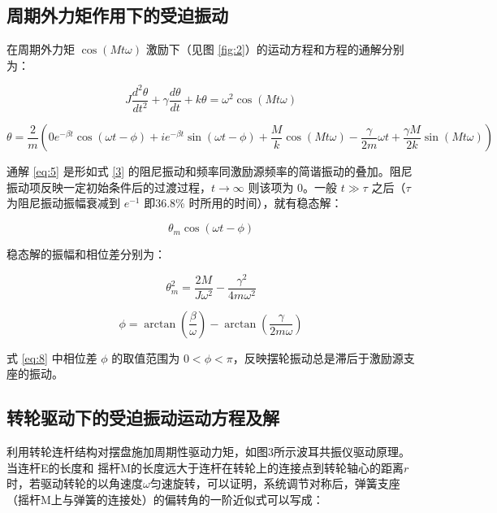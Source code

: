 \documentclass[12pt,a4paper]{amsart}
\begin{document}
\subsection{周期外力矩作用下的受迫振动}

在周期外力矩 $\cos(Mt\omega)$ 激励下（见图 \ref{fig:2}）的运动方程和方程的通解分别为：

\begin{equation}
    J\frac{d^2\theta}{dt^2} + \gamma\frac{d\theta}{dt} + k\theta = \omega^2 \cos(Mt\omega) \label{eq:4}
\end{equation}

\begin{equation}
    \theta = \frac{2}{m}\left(0 e^{-\beta t}\cos(\omega t - \phi) + i e^{-\beta t}\sin(\omega t - \phi) + \frac{M}{k}\cos(Mt\omega) - \frac{\gamma}{2m}\omega t + \frac{\gamma M}{2k}\sin(Mt\omega)\right) \label{eq:5}
\end{equation}

通解 \ref{eq:5} 是形如式 \ref{3} 的阻尼振动和频率同激励源频率的简谐振动的叠加。阻尼振动项反映一定初始条件后的过渡过程，$t \rightarrow \infty$ 则该项为 0。一般 $t \gg \tau$ 之后（$\tau$ 为阻尼振动振幅衰减到 $e^{-1}$ 即36.8\% 时所用的时间），就有稳态解：

\begin{equation}
    \theta_m \cos(\omega t - \phi) \label{eq:6}
\end{equation}

稳态解的振幅和相位差分别为：

\begin{equation}
    \theta_m^2 = \frac{2M}{J\omega^2} - \frac{\gamma^2}{4m\omega^2} \label{eq:7}
\end{equation}

\begin{equation}
    \phi = \arctan\left(\frac{\beta}{\omega}\right) - \arctan\left(\frac{\gamma}{2m\omega}\right) \label{eq:8}
\end{equation}

式 \ref{eq:8} 中相位差 $\phi$ 的取值范围为 $0 < \phi < \pi$，反映摆轮振动总是滞后于激励源支座的振动。

\subsection{转轮驱动下的受迫振动运动方程及解}

利用转轮连杆结构对摆盘施加周期性驱动力矩，如图3所示波耳共振仪驱动原理。当连杆E的长度和
摇杆M的长度远大于连杆在转轮上的连接点到转轮轴心的距离$r$时，若驱动转轮的以角速度$\omega$匀速旋转，可以证明，系统调节对称后，弹簧支座（摇杆M上与弹簧的连接处）的偏转角的一阶近似式可以写成：
\end{document}
